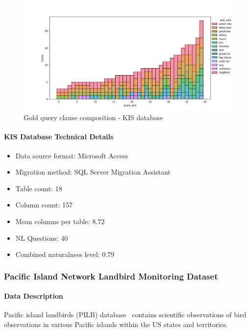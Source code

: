 \begin{figure}[H]
  \centering
  \includegraphics[width=\linewidth]{figures/query-stats/KlamathInvasiveSpecies-stats-clause-counts.png}
  \caption{Gold query clause composition - KIS database}
  \label{fig:query-complexity-kis}
\end{figure}

\paragraph{KIS Database Technical Details}
\begin{itemize}
  \item Data source format: Microsoft Access
  \item Migration method: SQL Server Migration Assistant
  \item Table count: 18
  \item Column count: 157
  \item Mean columns per table: 8.72
  \item NL Questions: 40
  \item Combined naturalness level: 0.79 
\end{itemize}

\subsubsection{Pacific Island Network Landbird Monitoring Dataset}

\paragraph{Data Description}
Pacific island landbirds (PILB) database~\cite{pilb-dataset} contains scientific observations of bird observations in various Pacific islands within the US states and territories.

